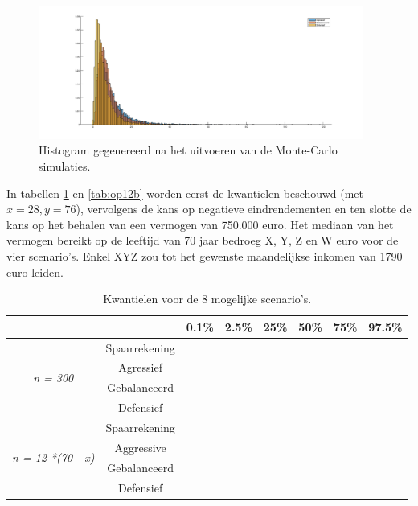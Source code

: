 \begin{figure}
\centering
\includegraphics[width=0.95\textwidth]{res/op11.png}
\caption{Histogram gegenereerd na het uitvoeren van de Monte-Carlo simulaties.}
\label{fig:op11}
\end{figure}
\thispagestyle{empty}
\restoregeometry



In tabellen \ref{tab:op12a} en \ref{tab:op12b} worden eerst de kwantielen beschouwd (met $x=28, y=76$), vervolgens de kans op negatieve eindrendementen en ten slotte de kans op het behalen van een vermogen van 750.000 euro. Het mediaan van het vermogen bereikt op de leeftijd van 70 jaar bedroeg X, Y, Z en W euro voor de vier scenario's. Enkel XYZ zou tot het gewenste maandelijkse inkomen van 1790 euro leiden.

\begin{table}[h]
\centering
\begin{tabular}{cc|cccccc}
\multicolumn{1}{l}{}                       &               & 0.1\%     & 2.5\%     & 25\%      & 50\%      & 75\%      & 97.5\%    \\ \hline
\multirow{4}{*}{\textit{n = 300}}          & Spaarrekening & \textit{} & \textit{} & \textit{} & \textit{} & \textit{} & \textit{} \\
                                           & Agressief    & \textit{} & \textit{} & \textit{} & \textit{} & \textit{} & \textit{} \\
                                           & Gebalanceerd  & \textit{} & \textit{} & \textit{} & \textit{} & \textit{} & \textit{} \\
                                           & Defensief     & \textit{} & \textit{} & \textit{} & \textit{} & \textit{} & \textit{} \\ \hline
\multirow{4}{*}{\textit{n = 12 *(70 - x)}} & Spaarrekening & \textit{} & \textit{} & \textit{} & \textit{} & \textit{} & \textit{} \\
                                           & Aggressive    & \textit{} & \textit{} & \textit{} & \textit{} & \textit{} & \textit{} \\
                                           & Gebalanceerd  & \textit{} & \textit{} & \textit{} & \textit{} & \textit{} & \textit{} \\
                                           & Defensief     & \textit{} & \textit{} & \textit{} & \textit{} & \textit{} & \textit{}
\end{tabular}
\caption{Kwantielen voor de 8 mogelijke scenario's.}
\label{tab:op12a}
\end{table}

